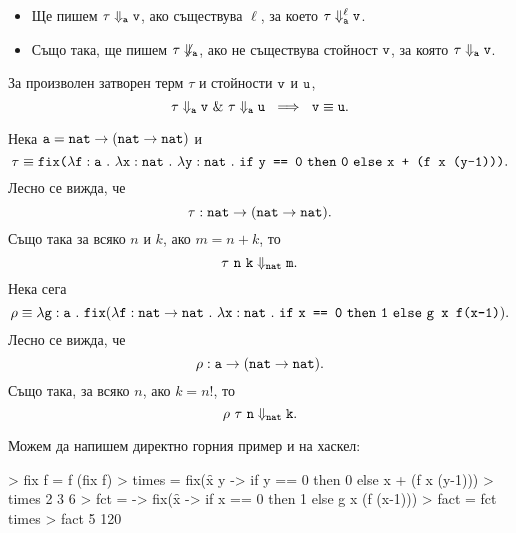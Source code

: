 \begin{prooftree}
\end{prooftree}

\begin{itemize}
\item 
  Ще пишем $\tau \Downarrow_{\vv{a}} \vv{v}$, ако съществува $\ell$, за което $\tau \Downarrow^\ell_{\vv{a}} \vv{v}$.  
\item
  Също така, ще пишем $\tau \not\Downarrow_{\vv{a}}$, ако не съществува стойност $\vv{v}$, за която $\tau \Downarrow_{\vv{a}} \vv{v}$.  
\end{itemize}

\begin{lemma}
  За произволен затворен терм $\tau$ и стойности $\vv{v}$ и $\vv{u}$,
  \[\tau \Downarrow_{\vv{a}} \vv{v}\ \&\ \tau \Downarrow_{\vv{a}} \vv{u}\ \implies\ \vv{v} \equiv \vv{u}.\]
\end{lemma}


\begin{example}
  Нека $\vv{a} = \vv{nat} \to (\vv{nat} \to \vv{nat})$ и 
  \[\tau \equiv \fix\vv{(}\lamb{f}{a}{\lamb{x}{nat}{\lamb{y}{nat}{\ifelse{\vv{y == 0}}{\vv{0}}{\vv{x + (f x (y-1))} }}}}\vv{)}.\]
  Лесно се вижда, че
  \[\tau:\vv{nat} \to (\vv{nat} \to \vv{nat}).\]
  Също така за всяко $n$ и $k$, ако $m = n + k$, то
  \[\tau\ \vv{n}\ \vv{k} \Downarrow_{\vv{nat}} \vv{m}.\]
  Нека сега
  \[\rho \equiv \lamb{g}{a}{\fix(\lambda \vv{f} : \vv{nat}\to\vv{nat}\ .\ \lamb{x}{nat}{\ifelse{\vv{x == 0}}{\vv{1}}{\vv{g x f(x-1)}}}}).\]
  Лесно се вижда, че
  \[ \rho : \vv{a} \to (\vv{nat} \to \vv{nat}).\]
  Също така, за всяко $n$, ако $k = n!$, то
  \[ \rho\ \tau\ \vv{n} \Downarrow_{\vv{nat}} \vv{k}.\]
\end{example}


Можем да напишем директно горния пример и на хаскел:
\begin{haskellcode}
> fix f = f (fix f)
> times = fix(\f x y -> if y == 0 then 0 else x + (f x (y-1)))
> times 2 3
6
> fct = \g -> fix(\f x -> if x == 0 then 1 else g x (f (x-1)))
> fact = fct times
> fact 5
120
\end{haskellcode}

